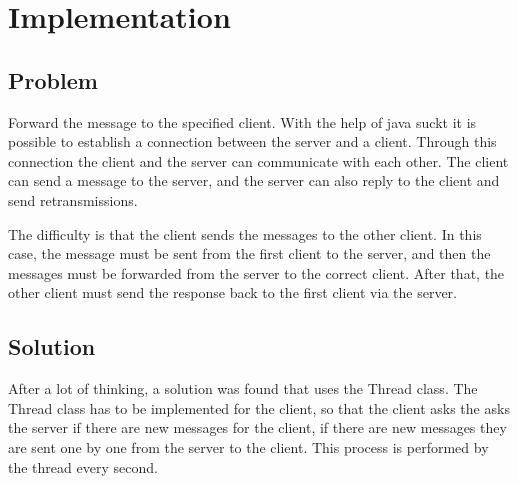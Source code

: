 \chapter{Implementation}\label{ch:implementation}


\section{Problem}\label{sec:problem}
Forward the message to the specified client.
With the help of java suckt it is possible to establish a connection between the server and
a client.
Through this connection the client and the server can communicate with each other.
The client can send a message to the server, and the server can also reply to the client and
send retransmissions.
\medskip

\noindent
The difficulty is that the client sends the messages to the other client.
In this case, the message must be sent from the first client to the server, and then the
messages must be forwarded from the server to the correct client.
After that, the other client must send the response back to the first client via the server.


\section{Solution}\label{sec:solution}
After a lot of thinking, a solution was found that uses the Thread class.
The Thread class has to be implemented for the client, so that the client asks the asks the server
if there are new messages for the client, if there are new messages they are sent one by one from
the server to the client.
This process is performed by the thread every second.


